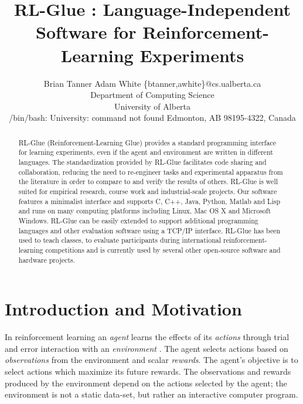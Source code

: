 \documentclass[twoside,11pt]{article}
\begin{document}
\title{RL-Glue : Language-Independent Software for Reinforcement-Learning Experiments}


\author{\name Brian Tanner \AND Adam White  \email \{btanner,awhite\}@cs.ualberta.ca \\
       \addr Department of Computing Science\\
       University of Alberta\\
/bin/bash: University: command not found
       Edmonton, AB 98195-4322, Canada}


\maketitle

\begin{abstract}%
RL-Glue (Reinforcement-Learning Glue) provides a standard programming interface for learning experiments, even if the agent and environment are written in different languages. 
The standardization provided by RL-Glue facilitates code sharing and collaboration, reducing the need to re-engineer tasks and experimental apparatus from the literature in order to compare to and verify the results of others.
RL-Glue is well suited for empirical research, course work and industrial-scale projects. Our software features a minimalist interface and supports C, C++, Java, Python, Matlab and Lisp and runs on many computing platforms including Linux, Mac OS X and Microsoft Windows. RL-Glue can be easily extended to support additional programming languages and other evaluation software using a TCP/IP interface. RL-Glue has been used to teach classes, to evaluate participants during international reinforcement-learning competitions and is currently used by several other open-source software and hardware projects.
\end{abstract}

\section{Introduction and Motivation}
In reinforcement learning an {\it agent} learns the effects of its {\it actions} through trial and error interaction with an {\it environment} \citep{rlbook, rlsurvey,ndp}. The agent selects actions based on {\it observations} from the environment and scalar {\it rewards}. The agent's objective is to select actions which maximize its future rewards. The observations and rewards produced by the environment depend on the actions selected by the agent; the environment is not a static data-set, but rather an interactive computer program.
\end{document}
